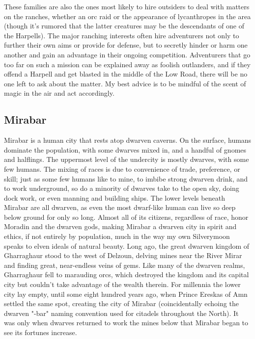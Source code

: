 \documentclass[10pt,a4paper,twoside,twocolumn,openany,bg=print,nodeprecatedcode]{dndbook}
\begin{document}
These families are also the ones most likely to hire outsiders to deal with matters on the ranches, whether an orc raid or the appearance of lycanthropes in the area (though it's rumored that the latter creatures may be the descendants of one of the Harpells). The major ranching interests often hire adventurers not only to further their own aims or provide for defense, but to secretly hinder or harm one another and gain an advantage in their ongoing competition. Adventurers that go too far on such a mission can be explained away as foolish outlanders, and if they offend a Harpell and get blasted in the middle of the Low Road, there will be no one left to ask about the matter. My best advice is to be mindful of the scent of magic in the air and act accordingly.
\subsection{Mirabar}
Mirabar is a human city that rests atop dwarven caverns. On the surface, humans dominate the population, with some dwarves mixed in, and a handful of gnomes and halflings. The uppermost level of the undercity is mostly dwarves, with some few humans. The mixing of races is due to convenience of trade, preference, or skill; just as some few humans like to mine, to imbibe strong dwarven drink, and to work underground, so do a minority of dwarves take to the open sky, doing dock work, or even manning and building ships. The lower levels beneath Mirabar are all dwarven, as even the most dwarf-like human can live so deep below ground for only so long. Almost all of its citizens, regardless of race, honor Moradin and the dwarven gods, making Mirabar a dwarven city in spirit and ethics, if not entirely by population, much in the way my own Silverymoon speaks to elven ideals of natural beauty.
Long ago, the great dwarven kingdom of Gharraghaur stood to the west of Delzoun, delving mines near the River Mirar and finding great, near-endless veins of gems. Like many of the dwarven realms, Gharraghaur fell to marauding orcs, which destroyed the kingdom and its capital city but couldn't take advantage of the wealth therein. For millennia the lower city lay empty, until some eight hundred years ago, when Prince Ereskas of Amn settled the same spot, creating the city of Mirabar (coincidentally echoing the dwarven "-bar" naming convention used for citadels throughout the North). It was only when dwarves returned to work the mines below that Mirabar began to see its fortunes increase.
\end{document}
